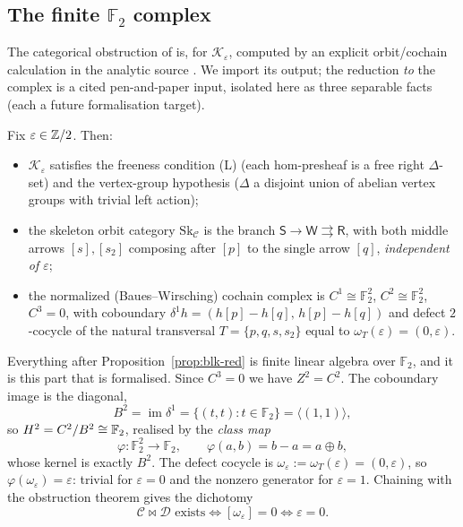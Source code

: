 \subsection*{The finite $\mathbb{F}_2$ complex}

The categorical obstruction of \cite{cl-h2edges} is, for $\mathcal K_\varepsilon$,
computed by an explicit orbit/cochain calculation in the analytic source
\cite{macbeth-reduction}. We import its output; the reduction \emph{to} the complex is a
cited pen-and-paper input, isolated here as three separable facts (each a future
formalisation target).

\begin{proposition}
\label{prop:blk-red}
Fix $\varepsilon\in\mathbb{Z}/2$. Then:
\begin{itemize}
\item[\textup{(i)}] $\mathcal K_\varepsilon$ satisfies the freeness condition
  \textnormal{(L)} (each hom-presheaf is a free right $\Delta$-set) and the vertex-group
  hypothesis ($\Delta$ a disjoint union of abelian vertex groups with trivial left action);
\item[\textup{(ii)}] the skeleton orbit category $\mathrm{Sk}_{\mathcal C}$ is the branch
  $\mathsf S\to\mathsf W\rightrightarrows\mathsf R$, with both middle arrows $[s],[s_2]$
  composing after $[p]$ to the single arrow $[q]$, \emph{independent of $\varepsilon$};
\item[\textup{(iii)}] the normalized (Baues--Wirsching) cochain complex is
  $C^1\cong\mathbb{F}_2^2$, $C^2\cong\mathbb{F}_2^2$, $C^3=0$, with coboundary
  $\delta^1 h=(h[p]-h[q],\,h[p]-h[q])$ and defect $2$-cocycle of the natural transversal
  $T=\{p,q,s,s_2\}$ equal to $\omega_T(\varepsilon)=(0,\varepsilon)$.
\end{itemize}
\end{proposition}

Everything after Proposition~\ref{prop:blk-red} is finite linear algebra over
$\mathbb{F}_2$, and it is this part that is formalised. Since $C^3=0$ we have $Z^2=C^2$.
The coboundary image is the diagonal,
\[
  B^2=\operatorname{im}\delta^1=\{(t,t):t\in\mathbb{F}_2\}=\langle(1,1)\rangle,
\]
so $H^2=C^2/B^2\cong\mathbb{F}_2$, realised by the \emph{class map}
\[
  \varphi\colon\mathbb{F}_2^2\to\mathbb{F}_2,
  \qquad
  \varphi(a,b)=b-a=a\oplus b,
\]
whose kernel is exactly $B^2$. The defect cocycle is
$\omega_\varepsilon:=\omega_T(\varepsilon)=(0,\varepsilon)$, so
$\varphi(\omega_\varepsilon)=\varepsilon$: trivial for $\varepsilon=0$ and the nonzero
generator for $\varepsilon=1$. Chaining with the obstruction theorem gives the dichotomy
\[
  \mathcal C\bowtie\mathcal D \text{ exists}
  \iff [\omega_\varepsilon]=0
  \iff \varepsilon=0 .
\]

